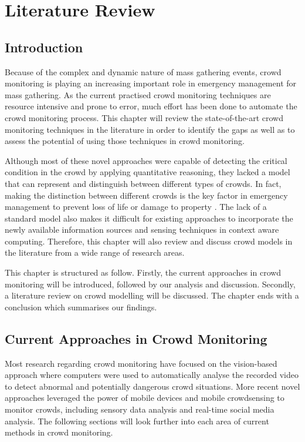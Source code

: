 \chapter{Literature Review}
\label{ch:litReview}
\ifpdf
    \graphicspath{{Chapter2/Figs/Raster/}{Chapter2/Figs/PDF/}{Chapter2/Figs/}}
\else
    \graphicspath{{Chapter2/Figs/Vector/}{Chapter2/Figs/}}
\fi

\section{Introduction}
Because of the complex and dynamic nature of mass gathering events, crowd monitoring is playing an increasing important role in emergency management for mass gathering. As the current practised crowd monitoring techniques are resource intensive and prone to error, much effort has been done to automate the crowd monitoring process. This chapter will review the state-of-the-art crowd monitoring techniques in the literature in order to identify the gaps as well as to assess the potential of using those techniques in crowd monitoring.

Although most of these novel approaches were capable of detecting the critical condition in the crowd by applying quantitative reasoning, they lacked a model that can represent and distinguish between different types of crowds. In fact, making the distinction between different crowds is the key factor in emergency management to prevent loss of life or damage to property \parencite{Berlonghi1995}. The lack of a standard model also makes it difficult for existing approaches to incorporate the newly available information sources and sensing techniques in context aware computing. Therefore, this chapter will also review and discuss crowd models in the literature from a wide range of research areas.

This chapter is structured as follow. Firstly, the current approaches in crowd monitoring will be introduced, followed by our analysis and discussion. Secondly, a literature review on crowd modelling will be discussed. The chapter ends with a conclusion which summarises our findings.

\section{Current Approaches in Crowd Monitoring}
Most research regarding crowd monitoring have focused on the vision-based approach where computers were used to automatically analyse the recorded video to detect abnormal and potentially dangerous crowd situations. More recent novel approaches leveraged the power of mobile devices and mobile crowdsensing to monitor crowds, including sensory data analysis and real-time social media analysis. The following sections will look further into each area of current methods in crowd monitoring. 

